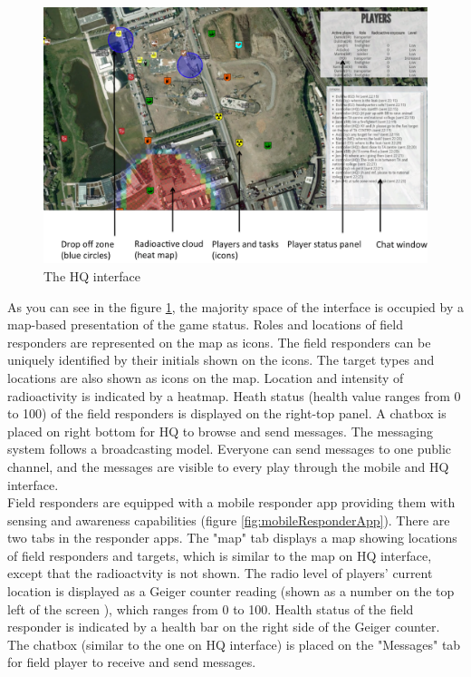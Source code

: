 \begin{figure}[h]
  \centering
  \includegraphics[width=1\textwidth]{img/study1/webinterface}
  \caption{The HQ interface}
  \label{fig:HQinterface}
\end{figure}

As you can see in the figure \ref{fig:HQinterface}, the majority space of the interface is occupied by a map-based presentation of the game status. Roles and locations of field responders are represented on the map as icons. The field responders can be uniquely identified by their initials shown on the icons. The target types and locations are also shown as icons on the map. Location and intensity of radioactivity is indicated by a heatmap. Heath status (health value ranges from 0 to 100) of the field responders is displayed on the right-top panel. A chatbox is placed on right bottom for HQ to browse and send messages. The messaging system follows a broadcasting model. Everyone can send messages to one public channel, and the messages are visible to every play through the mobile and HQ interface.\\

Field responders are equipped with a mobile responder app providing them with sensing and awareness capabilities (figure \ref{fig:mobileResponderApp}). There are two tabs in the responder apps. The "map" tab displays a map showing locations of field responders and targets, which is similar to the map on HQ interface, except that the radioactvity is not shown. The radio level of players' current location is displayed as a Geiger counter reading (shown as a number on the top left of the screen ), which ranges from 0 to 100. Health status of the field responder is indicated by a health bar on the right side of the Geiger counter. The chatbox (similar to the one on HQ interface) is placed on the "Messages" tab for field player to receive and send messages.\\


